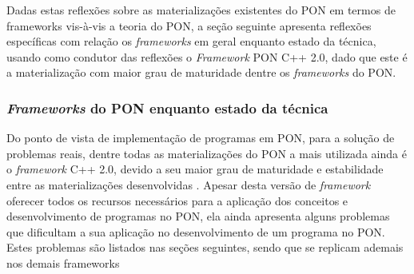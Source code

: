 Dadas estas reflexões sobre as materializações existentes do PON em termos de
frameworks vis-à-vis a teoria do PON, a seção seguinte apresenta reflexões
específicas com relação os \textit{frameworks} em geral enquanto estado da
técnica, usando como condutor das reflexões o \textit{Framework} PON C++ 2.0,
dado que este é a materialização com maior grau de maturidade dentre os
\textit{frameworks} do PON.

\subsubsection{\textit{Frameworks} do PON enquanto estado da
técnica}\label{sec:reflex_cpp2}

Do ponto de vista de implementação de programas em PON, para a solução de
problemas reais, dentre todas as materializações do PON a mais utilizada ainda é
o \textit{framework} C++ 2.0, devido a seu maior grau de maturidade e
estabilidade entre as materializações desenvolvidas \cite{ronszcka_2017}. Apesar
desta versão de \textit{framework} oferecer todos os recursos necessários para a
aplicação dos conceitos e desenvolvimento de programas no PON, ela ainda
apresenta alguns problemas que dificultam a sua aplicação no desenvolvimento de
um programa no PON. Estes problemas são listados nas seções seguintes, sendo que
se replicam ademais nos demais frameworks

